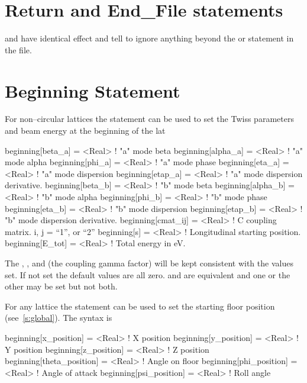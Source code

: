 \section{Return and End_File statements}

 and  have identical effect and tell \bmad to
ignore anything beyond the  or  statement in
the file.

\section{Beginning Statement}
\label{s:beginning}

For non--circular lattices the  statement can be used to
set the Twiss parameters and beam energy at the beginning of the lat
\begin{example}
  beginning[beta_a]  = <Real>  ! "a" mode beta
  beginning[alpha_a] = <Real>  ! "a" mode alpha
  beginning[phi_a]   = <Real>  ! "a" mode phase
  beginning[eta_a]   = <Real>  ! "a" mode dispersion
  beginning[etap_a]  = <Real>  ! "a" mode dispersion derivative.
  beginning[beta_b]  = <Real>  ! "b" mode beta
  beginning[alpha_b] = <Real>  ! "b" mode alpha
  beginning[phi_b]   = <Real>  ! "b" mode phase
  beginning[eta_b]   = <Real>  ! "b" mode dispersion
  beginning[etap_b]  = <Real>  ! "b" mode dispersion derivative.
  beginning[cmat_ij] = <Real>  ! C coupling matrix. i, j = {``1'', or ``2''} 
  beginning[s]       = <Real>  ! Longitudinal starting position.
  beginning[E_tot] = <Real>  ! Total energy in eV.
\end{example}
The , , and  (the coupling gamma
factor) will be kept consistent with the values set. If not set the
default values are all zero.   and
 are equivalent and one or the other may be
set but not both.

For any lattice the  statement can be used to set the starting floor position 
(see~\ref{s:global}). The syntax is
\begin{example}
  beginning[x_position]     = <Real>  ! X position
  beginning[y_position]     = <Real>  ! Y position
  beginning[z_position]     = <Real>  ! Z position
  beginning[theta_position] = <Real>  ! Angle on floor
  beginning[phi_position]   = <Real>  ! Angle of attack
  beginning[psi_position]   = <Real>  ! Roll angle
\end{example}

